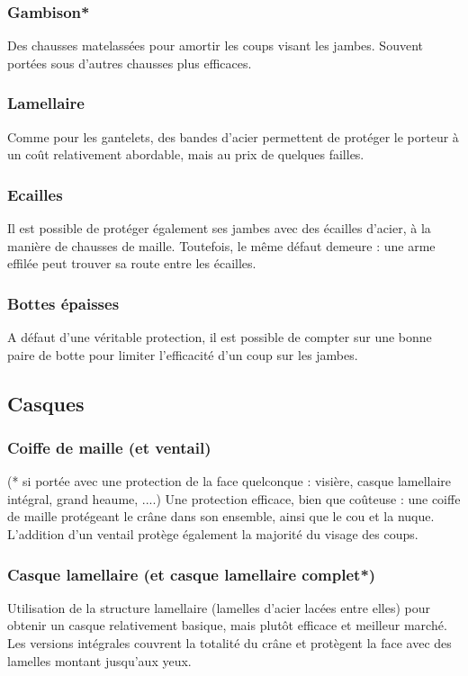 \documentclass[10pt,a4paper,twocolumn]{book}
\begin{document}
\subsubsection{Gambison*}
Des chausses matelassées pour amortir les coups visant les jambes. Souvent portées sous d'autres chausses plus efficaces.
\subsubsection{Lamellaire}
Comme pour les gantelets, des bandes d'acier permettent de protéger le porteur à un coût relativement abordable, mais au prix de quelques failles.
\subsubsection{Ecailles}
Il est possible de protéger également ses jambes avec des écailles d'acier, à la manière de chausses de maille. Toutefois, le même défaut demeure : une arme effilée peut trouver sa route entre les écailles.
\subsubsection{Bottes épaisses}
A défaut d'une véritable protection, il est possible de compter sur une bonne paire de botte pour limiter l'efficacité d'un coup sur les jambes.

\subsection{Casques}
\subsubsection{Coiffe de maille (et ventail)}
 (* si portée avec une protection de la face quelconque : visière, casque lamellaire intégral, grand heaume, ....)
Une protection efficace, bien que coûteuse : une coiffe de maille protégeant le crâne dans son ensemble, ainsi que le cou et la nuque. L'addition d'un ventail protège également la majorité du visage des coups.
\subsubsection{Casque lamellaire (et casque lamellaire complet*)}
Utilisation de la structure lamellaire (lamelles d'acier lacées entre elles) pour obtenir un casque relativement basique, mais plutôt efficace et meilleur marché. Les versions intégrales couvrent la totalité du crâne et protègent la face avec des lamelles montant jusqu'aux yeux.
\end{document}
